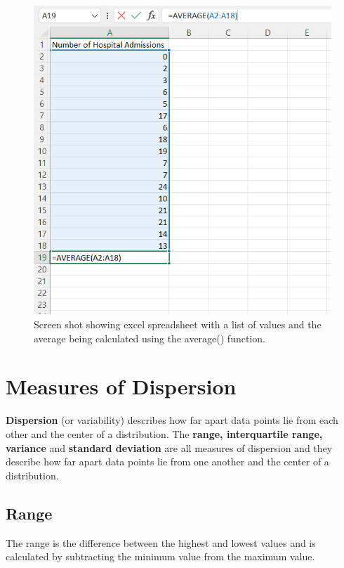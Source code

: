 \documentclass[
]{book}
\begin{document}
\begin{figure}
\centering
\includegraphics{Excelimage.png}
\caption{Screen shot showing excel spreadsheet with a list of values and the average being calculated using the average() function.}
\end{figure}

\hypertarget{measures-of-dispersion}{%
\section{Measures of Dispersion}\label{measures-of-dispersion}}

\textbf{Dispersion} (or variability) describes how far apart data points lie from each other and the center of a distribution. The \textbf{range, interquartile range, variance} and \textbf{standard deviation} are all measures of dispersion and they describe how far apart data points lie from one another and the center of a distribution.

\hypertarget{range}{%
\subsection{Range}\label{range}}

The range is the difference between the highest and lowest values and is calculated by subtracting the minimum value from the maximum value.
\end{document}
